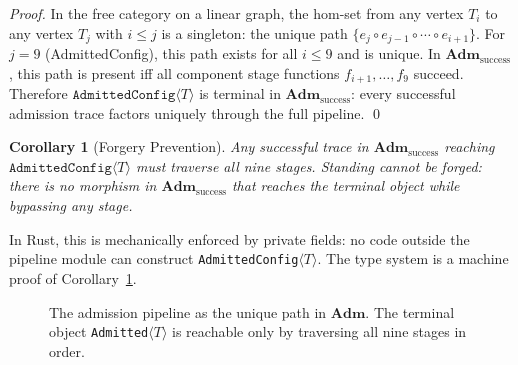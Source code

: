\documentclass[12pt, letterpaper]{report}
\theoremstyle{plain}
\newtheorem{corollary}[theorem]{Corollary}
\theoremstyle{definition}
\theoremstyle{remark}
\begin{document}
\begin{proof}
In the free category on a linear graph, the hom-set from any vertex $T_i$
to any vertex $T_j$ with $i \leq j$ is a singleton: the unique path
$\{e_j \circ e_{j-1} \circ \cdots \circ e_{i+1}\}$.
For $j = 9$ (AdmittedConfig), this path exists for all $i \leq 9$
and is unique.
In $\mathbf{Adm}_{\mathrm{success}}$, this path is present iff all
component stage functions $f_{i+1}, \ldots, f_9$ succeed.
Therefore $\texttt{AdmittedConfig}\langle T\rangle$ is terminal in
$\mathbf{Adm}_{\mathrm{success}}$:
every successful admission trace factors uniquely through the full pipeline. \qed
\end{proof}

\begin{corollary}[Forgery Prevention]
\label{cor:forgery}
Any successful trace in $\mathbf{Adm}_{\mathrm{success}}$ reaching
$\texttt{AdmittedConfig}\langle T\rangle$ must traverse all nine stages.
Standing cannot be forged: there is no morphism in
$\mathbf{Adm}_{\mathrm{success}}$ that reaches the terminal object
while bypassing any stage.
\end{corollary}

In Rust, this is mechanically enforced by private fields: no code outside
the pipeline module can construct \texttt{AdmittedConfig}$\langle T\rangle$.
The type system is a machine proof of Corollary~\ref{cor:forgery}.

\begin{figure}[h]
\centering
{}
\caption{The admission pipeline as the unique path in $\mathbf{Adm}$.
The terminal object \texttt{Admitted}$\langle T\rangle$ is reachable only
by traversing all nine stages in order.}
\label{fig:pipeline}
\end{figure}
\end{document}
